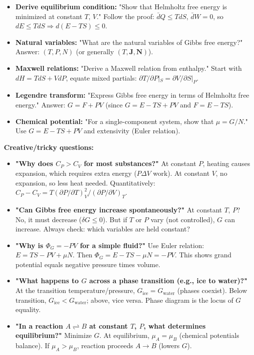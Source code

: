 \documentclass[9pt,twocoloumn]{article}
\begin{document}
\begin{itemize}
    \item \textbf{Derive equilibrium condition:} "Show that Helmholtz free energy is minimized at constant $T$, $V$." Follow the proof: $\bar{d}Q \leq T dS$, $\bar{d}W = 0$, so $dE \leq T dS \Rightarrow d(E - TS) \leq 0$.

    \item \textbf{Natural variables:} "What are the natural variables of Gibbs free energy?" Answer: $(T, P, N)$ (or generally $(T, \mathbf{J}, \mathbf{N})$).

    \item \textbf{Maxwell relations:} "Derive a Maxwell relation from enthalpy." Start with $dH = T dS + V dP$, equate mixed partials: $\partial T/\partial P |_S = \partial V/\partial S|_P$.

    \item \textbf{Legendre transform:} "Express Gibbs free energy in terms of Helmholtz free energy." Answer: $G = F + PV$ (since $G = E - TS + PV$ and $F = E - TS$).

    \item \textbf{Chemical potential:} "For a single-component system, show that $\mu = G/N$." Use $G = E - TS + PV$ and extensivity (Euler relation).
\end{itemize}

\textbf{Creative/tricky questions:}

\begin{itemize}
    \item \textbf{"Why does $C_P > C_V$ for most substances?"} At constant $P$, heating causes expansion, which requires extra energy ($P \Delta V$ work). At constant $V$, no expansion, so less heat needed. Quantitatively: $C_P - C_V = T (\partial P/\partial T)_V^2 / (\partial P/\partial V)_T$.

    \item \textbf{"Can Gibbs free energy increase spontaneously?"} At constant $T$, $P$? No, it must decrease ($\delta G \leq 0$). But if $T$ or $P$ vary (not controlled), $G$ can increase. Always check: which variables are held constant?

    \item \textbf{"Why is $\Phi_G = -PV$ for a simple fluid?"} Use Euler relation: $E = TS - PV + \mu N$. Then $\Phi_G = E - TS - \mu N = -PV$. This shows grand potential equals negative pressure times volume.

    \item \textbf{"What happens to $G$ across a phase transition (e.g., ice to water)?"} At the transition temperature/pressure, $G_{\text{ice}} = G_{\text{water}}$ (phases coexist). Below transition, $G_{\text{ice}} < G_{\text{water}}$; above, vice versa. Phase diagram is the locus of $G$ equality.

    \item \textbf{"In a reaction $A \rightleftharpoons B$ at constant $T$, $P$, what determines equilibrium?"} Minimize $G$. At equilibrium, $\mu_A = \mu_B$ (chemical potentials balance). If $\mu_A > \mu_B$, reaction proceeds $A \to B$ (lowers $G$).
\end{itemize}
\end{document}
